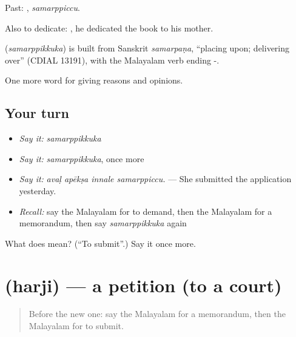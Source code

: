 Past: , \emph{samarppiccu}.

Also to dedicate:   , he dedicated the book to his mother.

\begin{cousinweb}
\textbf{} (\emph{samarppikkuka}) is built from Sanskrit \emph{samarpaṇa}, \textquotedblleft{}placing upon; delivering over\textquotedblright{} (CDIAL 13191), with the Malayalam verb ending -.
\end{cousinweb}

\begin{grammarlens}[title={What you've built}]
One more word for giving reasons and opinions.
\end{grammarlens}

\subsection*{Your turn}
\begin{itemize}
\raggedright
  \item \emph{Say it:} \emph{samarppikkuka}
  \item \emph{Say it:} \emph{samarppikkuka}, once more
  \item \emph{Say it:} \emph{avaḷ apēkṣa innale samarppiccu.} — She submitted the application yesterday.
  \item \emph{Recall:} say the Malayalam for to demand, then the Malayalam for a memorandum, then say \emph{samarppikkuka} again
\end{itemize}

\begin{tcolorbox}[breakable,colback=teal!4,colframe=teal!35!black,title={Before you move on}]
What does  mean? (\textquotedblleft{}To submit\textquotedblright{}.) Say it once more.
\end{tcolorbox}
\section[\texorpdfstring{\ml{ഹർജി} (harji)}{ഹർജി (harji)}]{ (harji) — a petition (to a court)}

\label{lesson:ML-C426-harji}



\begin{quote}
Before the new one: say the Malayalam for a memorandum, then the Malayalam for to submit.
\end{quote}

